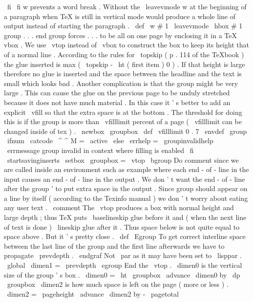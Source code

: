 {{%
\
fi
\
fi
}
%
w
prevents
a
word
break
.
Without
the
\
leavevmode
w
at
the
%
beginning
of
a
paragraph
when
TeX
is
still
in
vertical
mode
would
%
produce
a
whole
line
of
output
instead
of
starting
the
paragraph
.
\
def
\
w
#
1
{
\
leavevmode
\
hbox
{
#
1
}
}
%
group
.
.
.
end
group
forces
.
.
.
to
be
all
on
one
page
by
enclosing
%
it
in
a
TeX
vbox
.
We
use
\
vtop
instead
of
\
vbox
to
construct
the
box
%
to
keep
its
height
that
of
a
normal
line
.
According
to
the
rules
for
%
\
topskip
(
p
.
114
of
the
TeXbook
)
the
glue
inserted
is
%
max
(
\
topskip
-
\
ht
(
first
item
)
0
)
.
If
that
height
is
large
%
therefore
no
glue
is
inserted
and
the
space
between
the
headline
and
%
the
text
is
small
which
looks
bad
.
%
%
Another
complication
is
that
the
group
might
be
very
large
.
This
can
%
cause
the
glue
on
the
previous
page
to
be
unduly
stretched
because
it
%
does
not
have
much
material
.
In
this
case
it
'
s
better
to
add
an
%
explicit
\
vfill
so
that
the
extra
space
is
at
the
bottom
.
The
%
threshold
for
doing
this
is
if
the
group
is
more
than
\
vfilllimit
%
percent
of
a
page
(
\
vfilllimit
can
be
changed
inside
of
tex
)
.
%
\
newbox
\
groupbox
\
def
\
vfilllimit
{
0
.
7
}
%
\
envdef
\
group
{
%
\
ifnum
\
catcode
\
^
^
M
=
\
active
\
else
\
errhelp
=
\
groupinvalidhelp
\
errmessage
{
group
invalid
in
context
where
filling
is
enabled
}
%
\
fi
\
startsavinginserts
%
\
setbox
\
groupbox
=
\
vtop
\
bgroup
%
Do
comment
since
we
are
called
inside
an
environment
such
as
%
example
where
each
end
-
of
-
line
in
the
input
causes
an
%
end
-
of
-
line
in
the
output
.
We
don
'
t
want
the
end
-
of
-
line
after
%
the
group
'
to
put
extra
space
in
the
output
.
Since
group
%
should
appear
on
a
line
by
itself
(
according
to
the
Texinfo
%
manual
)
we
don
'
t
worry
about
eating
any
user
text
.
\
comment
}
%
%
The
\
vtop
produces
a
box
with
normal
height
and
large
depth
;
thus
TeX
puts
%
\
baselineskip
glue
before
it
and
(
when
the
next
line
of
text
is
done
)
%
\
lineskip
glue
after
it
.
Thus
space
below
is
not
quite
equal
to
space
%
above
.
But
it
'
s
pretty
close
.
\
def
\
Egroup
{
%
%
To
get
correct
interline
space
between
the
last
line
of
the
group
%
and
the
first
line
afterwards
we
have
to
propagate
\
prevdepth
.
\
endgraf
%
Not
\
par
as
it
may
have
been
set
to
\
lisppar
.
\
global
\
dimen1
=
\
prevdepth
\
egroup
%
End
the
\
vtop
.
%
\
dimen0
is
the
vertical
size
of
the
group
'
s
box
.
\
dimen0
=
\
ht
\
groupbox
\
advance
\
dimen0
by
\
dp
\
groupbox
%
\
dimen2
is
how
much
space
is
left
on
the
page
(
more
or
less
)
.
\
dimen2
=
\
pageheight
\
advance
\
dimen2
by
-
\
pagetotal
%
}}
